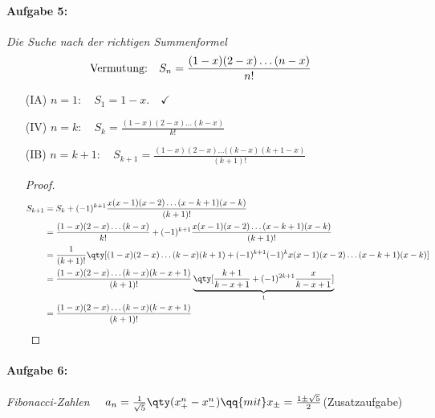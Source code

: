 \paragraph{Aufgabe 5: } \emph{Die Suche nach der richtigen Summenformel}\\
\begin{align}
\text{Vermutung: }\hspace{0.2cm} S_n=\frac{(1-x)(2-x)\dots(n-x)}{n!} \hspace{0.5cm}
\end{align}

\begin{enumerate}
    \setlength{\mathindent}{0cm}
    \item[(IA)] $n=1: \quad S_1 = 1-x. \quad\checkmark$ 
    \item[(IV)] $n=k: \quad S_k = \frac{(1-x)(2-x)\dots(k-x)}{k!}$
    \item[(IB)] $n=k+1: \quad S_{k+1} = \frac{(1-x)(2-x)\dots((k-x)(k+1-x)}{(k+1)!}$\\
    \begin{proof}
        \begin{align}
            S_{k+1}&=S_k+(-1)^{k+1}\frac{x(x-1)(x-2)\dots(x-k+1)(x-k)}{(k+1)!}\\
            &=\frac{(1-x)(2-x)\dots(k-x)}{k!}+(-1)^{k+1}\frac{x(x-1)(x-2)\dots(x-k+1)(x-k)}{(k+1)!}\\
            &=\frac{1}{(k+1)!}\qty[(1-x)(2-x)\dots(k-x)(k+1)+(-1)^{k+1}(-1)^kx(x-1)(x-2)\dots(x-k+1)(x-k)]\\
            &=\frac{(1-x)(2-x)\dots(k-x)(k-x+1)}{(k+1)!}\underbrace{\qty[\frac{k+1}{k-x+1}+(-1)^{2k+1}\frac{x}{k-x+1}]}_1\\
            &=\frac{(1-x)(2-x)\dots(k-x)(k-x+1)}{(k+1)!}
        \end{align}
    \end{proof}
\end{enumerate}

\paragraph{Aufgabe 6: } \emph{Fibonacci-Zahlen} $\quad a_n=\frac{1}{\sqrt{5}}\qty(x_+^n-x_-^n) \qq{mit}x_\pm = \frac{1\pm \sqrt{5}}{2}$\hfill (Zusatzaufgabe)

